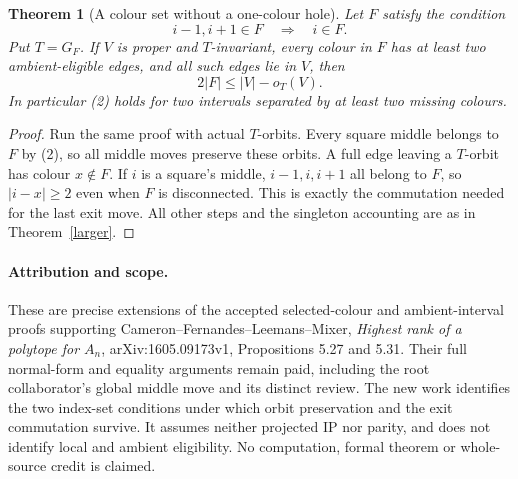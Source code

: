 \documentclass[11pt,a4paper]{article}
\newtheorem{theorem}{Theorem}
\begin{document}
\begin{theorem}[A colour set without a one-colour hole]\label{holes}
Let $F$ satisfy the condition
\[
              i-1,i+1\in F\quad\Longrightarrow\quad i\in F. \tag{2}
\]
Put $T=G_F$. If $V$ is proper and $T$-invariant, every colour in $F$
has at least two ambient-eligible edges, and all such edges lie in
$V$, then
\[
                         2|F|\le |V|-o_T(V).             \tag{3}
\]
In particular (2) holds for two intervals separated by at least two
missing colours.
\end{theorem}
\begin{proof}
Run the same proof with actual $T$-orbits. Every square middle belongs
to $F$ by (2), so all middle moves preserve these orbits. A full edge
leaving a $T$-orbit has colour $x\notin F$. If $i$ is a square's
middle, $i-1,i,i+1$ all belong to $F$, so $|i-x|\ge2$ even when
$F$ is disconnected. This is exactly the commutation needed for the
last exit move. All other steps and the singleton accounting are as
in Theorem~\ref{larger}.
\end{proof}

\paragraph{Attribution and scope.}
These are precise extensions of the accepted selected-colour and
ambient-interval proofs supporting Cameron--Fernandes--Leemans--Mixer,
\emph{Highest rank of a polytope for $A_n$}, arXiv:1605.09173v1,
Propositions 5.27 and 5.31. Their full normal-form and equality arguments
remain paid, including the root collaborator's global middle move and
its distinct review. The new work identifies the two index-set
conditions under which orbit preservation and the exit commutation
survive. It assumes neither projected IP nor parity, and does not
identify local and ambient eligibility. No computation, formal theorem
or whole-source credit is claimed.
\end{document}
